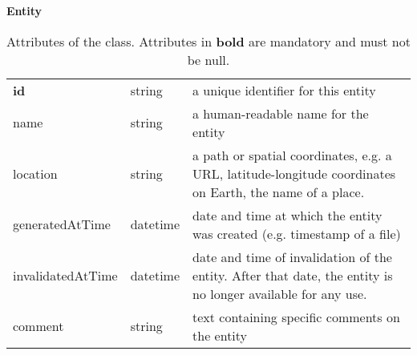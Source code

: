 \begin{table}[ht]
\small
{}\textwidth
\textbf{\normalsize Entity}\vspace{0.25em}\\
\begin{tabulary}{1.0\textwidth}{llL}
\toprule
{} &  & \\
\midrule
\textbf{id} & string & a unique identifier for this entity\\
name        & string & a human-readable name for the entity\\
location    & string & a path or spatial coordinates, e.g. a URL, latitude-longitude coordinates on Earth, the name of a place.\\
generatedAtTime  & datetime & date and time at which the entity was created (e.g. timestamp of a file)\\
invalidatedAtTime  & datetime & date and time of invalidation of the entity. After that date, the entity is no longer available for any use.\\
comment  &  string & text containing specific comments on the entity\\
\bottomrule
\end{tabulary}
\caption[Attributes of the  class]{Attributes of the  class. Attributes in \textbf{bold} are mandatory and must not be null.
}\label{tab:entity}
\end{table}



